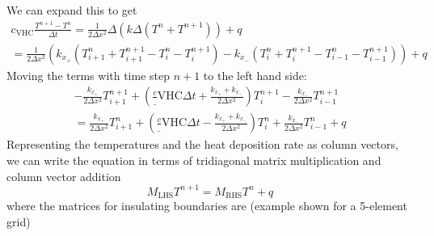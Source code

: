 \documentclass{scrartcl}
\newcommand{\VHC}{c_\mathrm{VHC}}
\begin{document}
We can expand this to get
\begin{multline}
\VHC \frac{T^{n+1}-T^n}{\Delta t} = \frac 1 {2\Delta x^2} \Delta \left( k \Delta \left(T^n + T^{n+1} \right) \right) + q\\
= \frac 1 {2\Delta x^2} \left( k_{x_+} \left(T_{i+1}^n + T_{i+1}^{n+1} - T_i^n - T_i^{n+1}\right) - k_{x_-} \left(T_i^n + T_i^{n+1} - T_{i-1}^n - T_{i-1}^{n+1}\right)\right) + q
\end{multline}
Moving the terms with time step $n+1$ to the left hand side:
\begin{equation}
\begin{split}
- \frac{k_{x_+}}{2\Delta x^2} T_{i+1}^{n+1} + \left( \frac \VHC {\Delta t} + \frac{k_{x_+}+k_{x_-}}{2\Delta x^2} \right) T_i^{n+1} - \frac{k_{x_-}}{2\Delta x^2} T_{i-1}^{n+1}\\
= \frac{k_{x_+}}{2\Delta x^2} T_{i+1}^n + \left( \frac \VHC {\Delta t} - \frac{k_{x_+} + k_{x_-}}{2\Delta x^2} \right) T_i^n + \frac{k_{x_-}}{2\Delta x^2} T_{i-1}^n + q
\end{split}
\end{equation}
Representing the temperatures and the heat deposition rate as column vectors, we can write the equation in terms of tridiagonal matrix multiplication and column vector addition
\begin{equation} \label{LHSRHS}
M_\mathrm{LHS} T^{n+1} = M_\mathrm{RHS} T^n + q
\end{equation}
where the matrices for insulating boundaries are (example shown for a 5-element grid)
\end{document}
